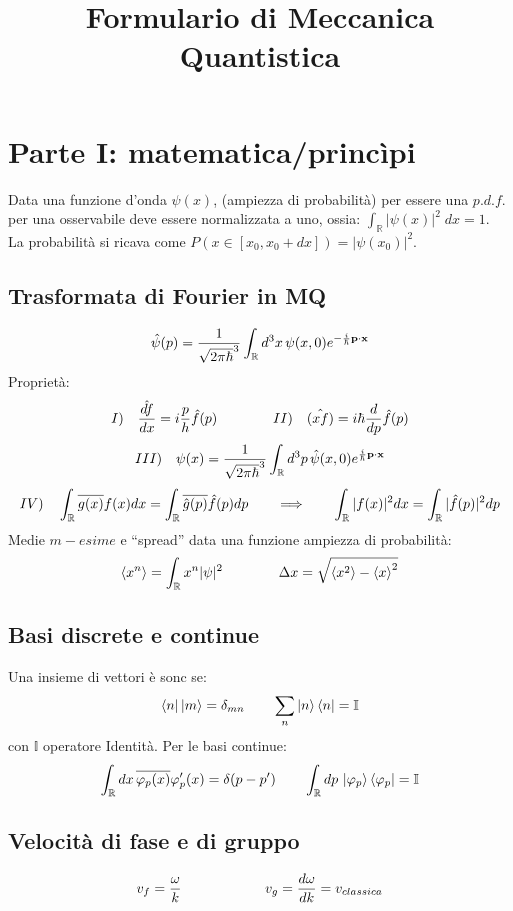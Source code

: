 


\title{Formulario di Meccanica Quantistica}
\author{}

\maketitle



\section{Parte I: matematica/princìpi}
Data una funzione d'onda $\psi(x)$, (ampiezza di probabilità) per essere una $p.d.f.$ per una osservabile deve essere normalizzata a uno,
ossia: $ \int_\mathbb{R} | \psi(x) |^2\; dx = 1 $. \\
La probabilità si ricava come $ P(x\in\left[x_0,x_0 + dx\right])= | \psi(x_0) |^2 $. \\
\subsection{Trasformata di Fourier in MQ}
$$
\hat{\psi}(p)= \frac{1}{\sqrt{2 \pi \hbar}^3} \int_\mathbb{R} d^3 x \, \psi(x,0) e^{-\frac{i}{\hbar} \mathbf{p}\cdot {\ensuremath{\mathbf{x}}}}$$ 
Proprietà:
$$
 I) \quad \hat{\frac{d f}{d x}} = i \frac{p}{h} \hat{f}(p)  \qquad \qquad II) \quad \hat{(xf)} = i \hbar \frac{d }{d p}\hat{f}(p)
$$
$$
III) \quad \psi(x)= \frac{1}{\sqrt{2 \pi \hbar}^3} \int_\mathbb{R} d^3 p \, \hat{\psi}(x,0) e^{\frac{i}{\hbar} \mathbf{p}\cdot {\ensuremath{\mathbf{x}}}}$$ 
$$
    IV) \quad \int_\mathbb{R} \overline{g(x)} f(x) dx =  \int_\mathbb{R} \overline{\hat{g}(p)}  \hat{f}(p) dp \qquad \Longrightarrow \qquad \int_\mathbb{R} |f(x)|^2 dx = \int_\mathbb{R} |\hat{f}(p)|^2 dp
$$
Medie $m-esime$ e ``spread'' data una funzione ampiezza di probabilità:
$$ \left< x ^{n} \right> = \int_\mathbb{R} x^n | \psi|^2 \qquad \qquad \Delta x = \sqrt{ \left< x ^{2} \right> - \left< x \right>^2}
$$ 
\subsection{Basi discrete e continue}
Una insieme di vettori è sonc se:
$$ 
 \left< n \right|\left| m \right> = \delta_{mn} \qquad \sum_n \left| n \right>\left< n \right| = \mathbb{I}
$$
con $\mathbb{I} $ operatore Identità.
Per le basi continue:
$$
\int_\mathbb{R} dx \, \overline{\varphi_p (x)} \varphi_p' (x)  = \delta(p-p') \qquad 
\int_\mathbb{R} dp \, \left| \varphi_p \right> \left< \varphi_p \right|  = \mathbb{I} 
$$

\subsection{Velocità di fase e di gruppo}
$$
v_f = \frac{\omega}{k} \qquad \qquad \qquad v_g= \frac{d \omega}{d k} = v_{classica}
$$
